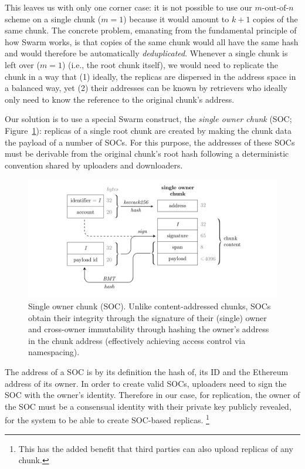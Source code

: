 \documentclass[manuscript,screen,review]{acmart}
\begin{document}
This leaves us with only one corner case: it is not possible to use our $m\text{-out-of-}n$ scheme on a single chunk ($m=1$) because it would amount to $k+1$ copies of the same chunk. The concrete problem, emanating from the fundamental principle of how Swarm works, is that copies of the same chunk would all have the same hash and would therefore be automatically \emph{deduplicated}. Whenever a single chunk is left over ($m=1$) (i.e., the root chunk itself), we would need to replicate the chunk in a way that (1) ideally, the replicas are dispersed in the address space in a balanced way, yet (2) their addresses can be known by retrievers who ideally only need to know the reference to the original chunk's address.

 
Our solution is to use a special Swarm construct, the \emph{single owner chunk} (SOC; Figure~\ref{fig:soc}): replicas of a single root chunk are created by making the chunk data the payload of a number of SOCs. For this purpose, the addresses of these SOCs must be derivable from the original chunk's root hash following a deterministic convention shared by uploaders and downloaders.

\begin{figure}[!ht]
  \centering
  \includegraphics[width=\textwidth]{single-owner-chunk.pdf}
  \caption{Single owner chunk (SOC). Unlike content-addressed chunks, SOCs obtain their integrity through the signature of their (single) owner and cross-owner immutability through hashing the owner's address in the chunk address (effectively achieving access control via namespacing).}
   \label{fig:soc}
  \end{figure}

The address of a SOC is by its definition the hash of, its ID and the Ethereum address of its owner. In order to create valid SOCs, uploaders need to sign the SOC with the owner's identity. Therefore in our case, for replication, the owner of the SOC must be a consensual identity with their private key publicly revealed, for the system to be able to create SOC-based replicas.
%
\footnote{This has the added benefit that third parties can also upload replicas of any chunk.}
\end{document}
